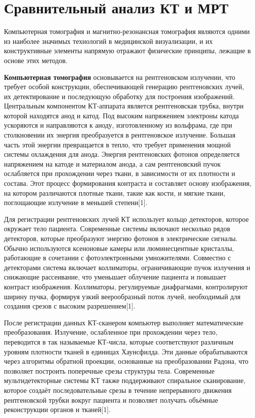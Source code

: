 \section{Сравнительный анализ КТ и МРТ}
Компьютерная томография и магнитно-резонансная томография являются одними из наиболее значимых технологий в медицинской визуализации, и их конструктивные элементы напрямую отражают физические принципы, лежащие в основе этих методов.

\textbf{Компьютерная томография} основывается на рентгеновском излучении, что требует особой конструкции, обеспечивающей генерацию рентгеновских лучей, их детектирование и последующую обработку для построения изображений. Центральным компонентом КТ-аппарата является рентгеновская трубка, внутри которой находятся анод и катод. Под высоким напряжением электроны катода ускоряются и направляются к аноду, изготовленному из вольфрама, где при столкновении их энергия преобразуется в рентгеновское излучение. Большая часть этой энергии превращается в тепло, что требует применения мощной системы охлаждения для анода. Энергия рентгеновских фотонов определяется напряжением на катоде и материалом анода, а сам рентгеновский пучок ослабляется при прохождении через ткани, в зависимости от их плотности и состава. Этот процесс формирования контраста и составляет основу изображения, на котором различаются плотные ткани, такие как кости, и мягкие ткани, поглощающие излучение в меньшей степени[1].

Для регистрации рентгеновских лучей КТ использует кольцо детекторов, которое окружает тело пациента. Современные системы включают несколько рядов детекторов, которые преобразуют энергию фотонов в электрические сигналы. Обычно используются ксеноновые камеры или люминесцентные кристаллы, работающие в сочетании с фотоэлектронными умножителями. Совместно с детекторами система включает коллиматоры, ограничивающие пучок излучения и снижающие рассеивание, что уменьшает облучение пациента и повышает контраст изображения. Коллиматоры, регулируемые диафрагмами, контролируют ширину пучка, формируя узкий веерообразный поток лучей, необходимый для создания срезов с высоким разрешением[1].

После регистрации данных КТ-сканером компьютер выполняет математические преобразования. Излучение, ослабленное при прохождении через тело, переводится в так называемые КТ-числа, которые соответствуют различным уровням плотности тканей в единицах Хаунсфилда. Эти данные обрабатываются через алгоритмы обратной проекции, основанные на преобразовании Радона, что позволяет построить поперечные срезы структуры тела. Современные мультидетекторные системы КТ также поддерживают спиральное сканирование, которое создаёт последовательные срезы в течение непрерывного движения рентгеновской трубки вокруг пациента и позволяет получать объёмные реконструкции органов и тканей[1].


